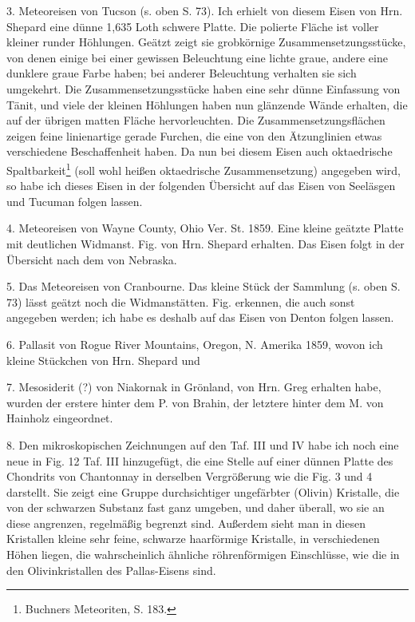 \documentclass[a4paper, 11pt, oneside]{article}
\begin{document}
3. Meteoreisen von Tucson (s. oben S. 73). Ich erhielt von diesem Eisen von Hrn. Shepard eine dünne 1,635 Loth schwere Platte. Die polierte Fläche ist voller kleiner runder Höhlungen. Geätzt zeigt sie grobkörnige Zusammensetzungsstücke, von denen einige bei einer gewissen Beleuchtung eine lichte graue, andere eine dunklere graue Farbe haben; bei anderer Beleuchtung verhalten sie sich umgekehrt. Die Zusammensetzungsstücke haben eine sehr dünne Einfassung von Tänit, und viele der kleinen Höhlungen haben nun glänzende Wände erhalten, die auf der übrigen matten Fläche hervorleuchten. Die Zusammensetzungsflächen zeigen feine linienartige gerade Furchen, die eine von den Ätzunglinien etwas verschiedene Beschaffenheit haben. Da nun bei diesem Eisen auch oktaedrische Spaltbarkeit\footnote{Buchners Meteoriten, S. 183.} (soll wohl heißen oktaedrische Zusammensetzung) angegeben wird, so habe ich dieses Eisen in der folgenden Übersicht auf das Eisen von Seeläsgen und Tucuman folgen lassen.

4. Meteoreisen von Wayne County, Ohio Ver. St. 1859. Eine kleine geätzte Platte mit deutlichen Widmanst. Fig. von Hrn. Shepard erhalten. Das Eisen folgt in der Übersicht nach dem von Nebraska.

5. Das Meteoreisen von Cranbourne. Das kleine Stück der Sammlung (s. oben S. 73) lässt geätzt noch die Widmanstätten. Fig. erkennen, die auch sonst angegeben werden; ich habe es deshalb auf das Eisen von Denton folgen lassen.

6. Pallasit von Rogue River Mountains, Oregon, N. Amerika 1859, wovon ich kleine Stückchen von Hrn. Shepard und

7. Mesosiderit (?) von Niakornak in Grönland, von Hrn. Greg erhalten habe, wurden der erstere hinter dem P. von Brahin, der letztere hinter dem M. von Hainholz eingeordnet.

8. Den mikroskopischen Zeichnungen auf den Taf. III und IV habe ich noch eine neue in Fig. 12 Taf. III hinzugefügt, die eine Stelle auf einer dünnen Platte des Chondrits von Chantonnay in derselben Vergrößerung wie die Fig. 3 und 4 darstellt. Sie zeigt eine Gruppe durchsichtiger ungefärbter (Olivin) Kristalle, die von der schwarzen Substanz fast ganz umgeben, und daher überall, wo sie an diese angrenzen, regelmäßig begrenzt sind. Außerdem sieht man in diesen Kristallen kleine sehr feine, schwarze haarförmige Kristalle, in verschiedenen Höhen liegen, die wahrscheinlich ähnliche röhrenförmigen Einschlüsse, wie die in den Olivinkristallen des Pallas-Eisens sind.
\end{document}
